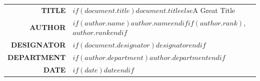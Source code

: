 \documentclass[12pt,a4paper,oneside]{letter}
\begin{document}

%

{%
\centering
\begin{tabular}{r|l}
\bf\large{TITLE}& $if(document.title)$$document.title$$else$A Great Title\\[2pt] 
\bf\large{AUTHOR}& $if(author.name)$$author.name$$endif$$if(author.rank)$, $author.rank$$endif$\\[2pt]
\bf\large{DESIGNATOR}& $if(document.designator)$$designator$$endif$\\[2pt]
\bf\large{DEPARTMENT}& $if(author.department)$$author.department$$endif$\\[2pt]
\bf\large{DATE}& $if(date)$$date$$endif$
\end{tabular}\par
}

%
\vspace{20pt}
\end{document}
